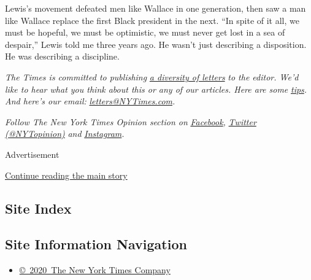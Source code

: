 Lewis's movement defeated men like Wallace in one generation, then saw a
man like Wallace replace the first Black president in the next. ``In
spite of it all, we must be hopeful, we must be optimistic, we must
never get lost in a sea of despair,'' Lewis told me three years ago. He
wasn't just describing a disposition. He was describing a discipline.

\emph{The Times is committed to publishing}
\href{https://www.nytimes3xbfgragh.onion/2019/01/31/opinion/letters/letters-to-editor-new-york-times-women.html}{\emph{a
diversity of letters}} \emph{to the editor. We'd like to hear what you
think about this or any of our articles. Here are some}
\href{https://help.nytimes3xbfgragh.onion/hc/en-us/articles/115014925288-How-to-submit-a-letter-to-the-editor}{\emph{tips}}\emph{.
And here's our email:}
\href{mailto:letters@NYTimes.com}{\emph{letters@NYTimes.com}}\emph{.}

\emph{Follow The New York Times Opinion section on}
\href{https://www.facebookcorewwwi.onion/nytopinion}{\emph{Facebook}}\emph{,}
\href{http://twitter.com/NYTOpinion}{\emph{Twitter (@NYTopinion)}}
\emph{and}
\href{https://www.instagram.com/nytopinion/}{\emph{Instagram}}\emph{.}

Advertisement

\protect\hyperlink{after-bottom}{Continue reading the main story}

\hypertarget{site-index}{%
\subsection{Site Index}\label{site-index}}

\hypertarget{site-information-navigation}{%
\subsection{Site Information
Navigation}\label{site-information-navigation}}

\begin{itemize}
\tightlist
\item
  \href{https://help.nytimes3xbfgragh.onion/hc/en-us/articles/115014792127-Copyright-notice}{©~2020~The
  New York Times Company}
\end{itemize}

